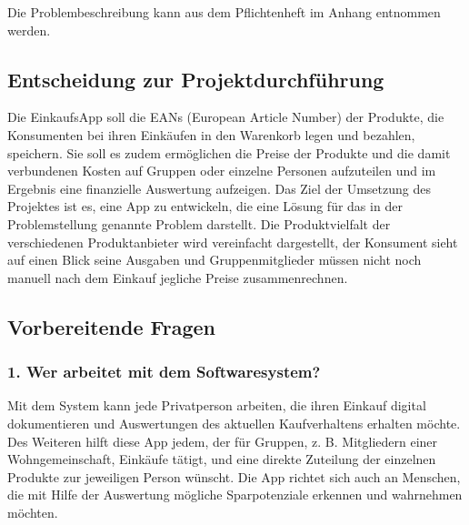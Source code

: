 \documentclass[12pt,a4paper]{article}
\begin{document}
Die Problembeschreibung kann aus dem Pflichtenheft im Anhang entnommen werden.


\subsection{Entscheidung zur Projektdurchführung}
Die EinkaufsApp soll die EANs (European Article Number) der Produkte, die Konsumenten bei ihren Einkäufen in den Warenkorb legen und bezahlen, speichern.
Sie soll es zudem ermöglichen die Preise der Produkte und die damit verbundenen Kosten auf Gruppen oder einzelne Personen aufzuteilen und im Ergebnis eine finanzielle Auswertung aufzeigen.
Das Ziel der Umsetzung des Projektes ist es, eine App zu entwickeln, die eine Lösung für das in der Problemstellung genannte Problem darstellt. 
Die Produktvielfalt der verschiedenen Produktanbieter wird vereinfacht dargestellt, der Konsument sieht auf einen Blick seine Ausgaben und Gruppenmitglieder müssen nicht noch manuell nach dem Einkauf jegliche Preise zusammenrechnen.

\newpage
\subsection{Vorbereitende Fragen}
\subsubsection*{1. Wer arbeitet mit dem Softwaresystem?}
Mit dem System kann jede Privatperson arbeiten, die ihren Einkauf digital dokumentieren und Auswertungen des aktuellen Kaufverhaltens erhalten möchte. Des Weiteren hilft diese App jedem, der für Gruppen, z. B. Mitgliedern einer Wohngemeinschaft, Einkäufe tätigt, und eine direkte Zuteilung der einzelnen Produkte zur jeweiligen Person wünscht. Die App richtet sich auch an Menschen, die mit Hilfe der Auswertung mögliche Sparpotenziale erkennen und wahrnehmen möchten. 
 
\end{document}
